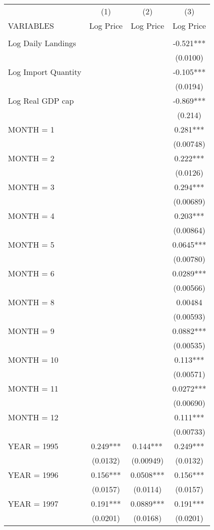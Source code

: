 \begin{tabular}{lccc} \hline
 & (1) & (2) & (3) \\
VARIABLES & Log Price & Log Price & Log Price \\ \hline
 &  &  &  \\
Log Daily Landings &  &  & -0.521*** \\
 &  &  & (0.0100) \\
Log Import Quantity &  &  & -0.105*** \\
 &  &  & (0.0194) \\
Log Real GDP cap &  &  & -0.869*** \\
 &  &  & (0.214) \\
MONTH = 1 &  &  & 0.281*** \\
 &  &  & (0.00748) \\
MONTH = 2 &  &  & 0.222*** \\
 &  &  & (0.0126) \\
MONTH = 3 &  &  & 0.294*** \\
 &  &  & (0.00689) \\
MONTH = 4 &  &  & 0.203*** \\
 &  &  & (0.00864) \\
MONTH = 5 &  &  & 0.0645*** \\
 &  &  & (0.00780) \\
MONTH = 6 &  &  & 0.0289*** \\
 &  &  & (0.00566) \\
MONTH = 8 &  &  & 0.00484 \\
 &  &  & (0.00593) \\
MONTH = 9 &  &  & 0.0882*** \\
 &  &  & (0.00535) \\
MONTH = 10 &  &  & 0.113*** \\
 &  &  & (0.00571) \\
MONTH = 11 &  &  & 0.0272*** \\
 &  &  & (0.00690) \\
MONTH = 12 &  &  & 0.111*** \\
 &  &  & (0.00733) \\
YEAR = 1995 & 0.249*** & 0.144*** & 0.249*** \\
 & (0.0132) & (0.00949) & (0.0132) \\
YEAR = 1996 & 0.156*** & 0.0508*** & 0.156*** \\
 & (0.0157) & (0.0114) & (0.0157) \\
YEAR = 1997 & 0.191*** & 0.0889*** & 0.191*** \\
 & (0.0201) & (0.0168) & (0.0201) \\

\end{tabular}
